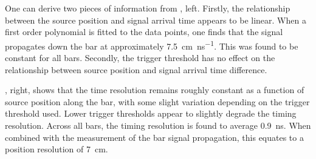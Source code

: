 One can derive two pieces of information from , left.
Firstly, the relationship between the source position and signal arrival time appears to be linear.
When a first order polynomial is fitted to the data points, one finds that the signal propagates down the bar at approximately \SI{7.5}{\cm\per\nano\second}.
This was found to be constant for all bars.
Secondly, the trigger threshold has no effect on the relationship between source position and signal arrival time difference.

, right, shows that the time resolution remains roughly constant as a function of source position along the bar, with some slight variation depending on the trigger threshold used.
Lower trigger thresholds appear to slightly degrade the timing resolution.
Across all bars, the timing resolution is found to average \SI{0.9}{\nano\second}.
When combined with the measurement of the bar signal propagation, this equates to a position resolution of \SI{7}{\cm}.
